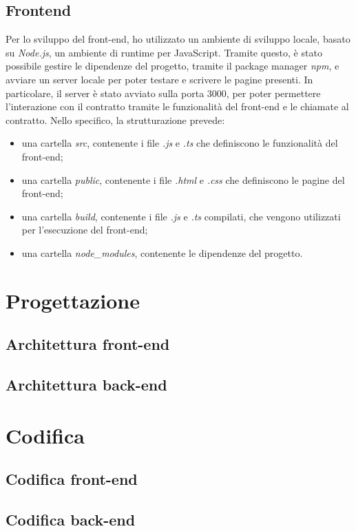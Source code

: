\subsection{Frontend}
Per lo sviluppo del front-end, ho utilizzato un ambiente di sviluppo locale, basato su \textit{Node.js}, un ambiente di runtime per JavaScript.
Tramite questo, è stato possibile gestire le dipendenze del progetto, tramite il package manager \textit{npm}, e avviare un server locale per poter testare
e scrivere le pagine presenti. In particolare, il server è stato avviato sulla porta 3000, per poter permettere l'interazione con il contratto tramite
le funzionalità del front-end e le chiamate al contratto.
Nello specifico, la strutturazione prevede:
\begin{itemize}
    \item una cartella \textit{src}, contenente i file \textit{.js} e \textit{.ts} che definiscono le funzionalità del front-end;
    \item una cartella \textit{public}, contenente i file \textit{.html} e \textit{.css} che definiscono le pagine del front-end;
    \item una cartella \textit{build}, contenente i file \textit{.js} e \textit{.ts} compilati, che vengono utilizzati per l'esecuzione del front-end;
    \item una cartella \textit{node\_modules}, contenente le dipendenze del progetto.
\end{itemize}

\section{Progettazione}\label{sec:progettazione-requisiti}

\subsection{Architettura front-end}

\subsection{Architettura back-end}

\section{Codifica}\label{sec:progettazione-requisiti}

\subsection{Codifica front-end}

\subsection{Codifica back-end}